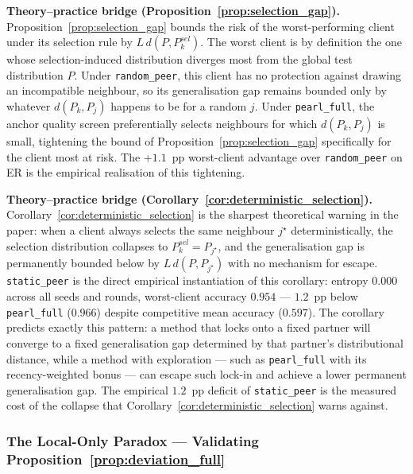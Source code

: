 \documentclass[conference]{IEEEtran}
\begin{document}
\textbf{Theory--practice bridge (Proposition~\ref{prop:selection_gap}).}
Proposition~\ref{prop:selection_gap} bounds the risk of the worst-performing client under its selection rule by $L\,d(P, P^{sel}_k)$. The worst client is by definition the one whose selection-induced distribution diverges most from the global test distribution $P$. Under \texttt{random\_peer}, this client has no protection against drawing an incompatible neighbour, so its generalisation gap remains bounded only by whatever $d(P_k, P_j)$ happens to be for a random $j$. Under \texttt{pearl\_full}, the anchor quality screen preferentially selects neighbours for which $d(P_k, P_j)$ is small, tightening the bound of Proposition~\ref{prop:selection_gap} specifically for the client most at risk. The $+1.1$~pp worst-client advantage over \texttt{random\_peer} on ER is the empirical realisation of this tightening.

\textbf{Theory--practice bridge (Corollary~\ref{cor:deterministic_selection}).}
Corollary~\ref{cor:deterministic_selection} is the sharpest theoretical warning in the paper: when a client always selects the same neighbour $j^\star$ deterministically, the selection distribution collapses to $P^{sel}_k = P_{j^\star}$, and the generalisation gap is permanently bounded below by $L\,d(P, P_{j^\star})$ with no mechanism for escape. \texttt{static\_peer} is the direct empirical instantiation of this corollary: entropy $0.000$ across all seeds and rounds, worst-client accuracy $0.954$ --- $1.2$~pp below \texttt{pearl\_full} ($0.966$) despite competitive mean accuracy ($0.597$). The corollary predicts exactly this pattern: a method that locks onto a fixed partner will converge to a fixed generalisation gap determined by that partner's distributional distance, while a method with exploration --- such as \texttt{pearl\_full} with its recency-weighted bonus --- can escape such lock-in and achieve a lower permanent generalisation gap. The empirical $1.2$~pp deficit of \texttt{static\_peer} is the measured cost of the collapse that Corollary~\ref{cor:deterministic_selection} warns against.

\subsubsection{The Local-Only Paradox — Validating Proposition~\ref{prop:deviation_full}}
\label{subsubsec:local-only-paradox}
\end{document}
